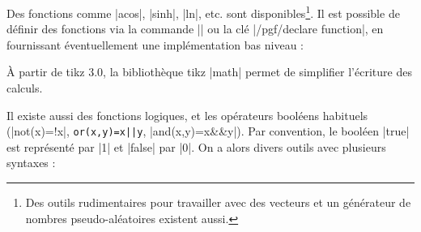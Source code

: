 \documentclass[a4paper]{ltxdoc}
\begin{document}
\begin{codeexample}[post={\pgfmathresult}]
\end{codeexample}

\begin{codeexample}[post={\pgfmathresult}]
\end{codeexample}

\begin{codeexample}[post={\pgfmathresult}]
\end{codeexample}

\begin{codeexample}[post={\pgfmathresult}]
\end{codeexample}

\begin{codeexample}[post={\pgfmathresult}]
\end{codeexample}

\begin{codeexample}[post={\pgfmathresult}]
\end{codeexample}

Des fonctions comme |acos|, |sinh|, |ln|, etc. sont disponibles\footnote{Des outils rudimentaires pour travailler avec des vecteurs et un générateur de nombres pseudo-aléatoires existent aussi.}. Il est possible de définir des fonctions via la commande |\pgfmathdeclarefunction| ou la clé |/pgf/declare function|, en fournissant éventuellement une implémentation bas niveau :


\begin{example only}
\shorthandoff{;:}
\pgfmathresult
\end{example only}

\begin{codeexample}
\pgfmathresult
\end{codeexample}

À partir de tikz 3.0, la bibliothèque tikz |math| permet de simplifier l'écriture des calculs.

Il existe aussi des fonctions logiques, et les opérateurs booléens habituels (|not(x)=!x|, \verb+or(x,y)=x||y+, |and(x,y)=x&&y|). Par convention, le booléen |true| est représenté par |1| et |false| par |0|. On a alors divers outils avec plusieurs syntaxes :
\end{document}
